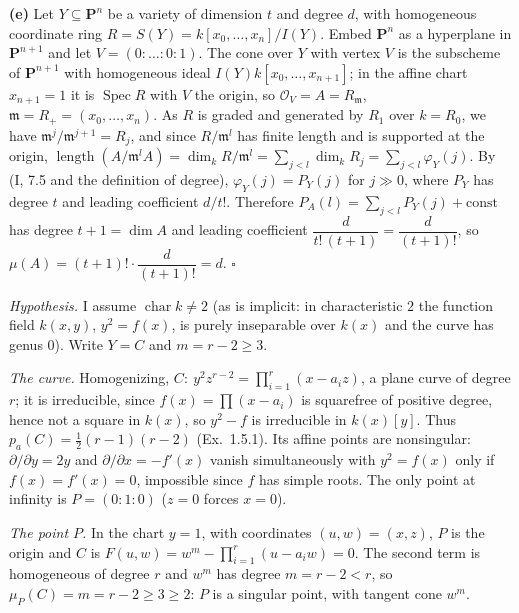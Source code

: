 \documentclass[11pt]{article}
\begin{document}
\textbf{(e)} Let $Y\subseteq\mathbf P^n$ be a variety of dimension $t$ and degree $d$, with homogeneous coordinate ring $R=S(Y)=k[x_0,\dots,x_n]/I(Y)$. Embed $\mathbf P^n$ as a hyperplane in $\mathbf P^{n+1}$ and let $V=(0:\dots:0:1)$. The cone over $Y$ with vertex $V$ is the subscheme of $\mathbf P^{n+1}$ with homogeneous ideal $I(Y)k[x_0,\dots,x_{n+1}]$; in the affine chart $x_{n+1}=1$ it is $\operatorname{Spec}R$ with $V$ the origin, so $\mathcal O_{V}=A=R_{\mathfrak m}$, $\mathfrak m=R_+=(x_0,\dots,x_n)$. As $R$ is graded and generated by $R_1$ over $k=R_0$, we have $\mathfrak m^j/\mathfrak m^{j+1}=R_j$, and since $R/\mathfrak m^l$ has finite length and is supported at the origin, $\operatorname{length}(A/\mathfrak m^lA)=\dim_kR/\mathfrak m^l=\sum_{j<l}\dim_kR_j=\sum_{j<l}\varphi_Y(j)$. By (I, 7.5 and the definition of degree), $\varphi_Y(j)=P_Y(j)$ for $j\gg0$, where $P_Y$ has degree $t$ and leading coefficient $d/t!$. Therefore $P_A(l)=\sum_{j<l}P_Y(j)+\mathrm{const}$ has degree $t+1=\dim A$ and leading coefficient $\dfrac{d}{t!\,(t+1)}=\dfrac d{(t+1)!}$, so $\mu(A)=(t+1)!\cdot\dfrac d{(t+1)!}=d$. \hfill$\square$

\pf
\emph{Hypothesis.} I assume $\operatorname{char}k\neq2$ (as is implicit: in characteristic $2$ the function field $k(x,y)$, $y^2=f(x)$, is purely inseparable over $k(x)$ and the curve has genus $0$). Write $Y=C$ and $m=r-2\ge3$.

\emph{The curve.} Homogenizing, $C:\ y^2z^{r-2}=\prod_{i=1}^r(x-a_iz)$, a plane curve of degree $r$; it is irreducible, since $f(x)=\prod(x-a_i)$ is squarefree of positive degree, hence not a square in $k(x)$, so $y^2-f$ is irreducible in $k(x)[y]$. Thus $p_a(C)=\frac12(r-1)(r-2)$ (Ex.~1.5.1). Its affine points are nonsingular: $\partial/\partial y=2y$ and $\partial/\partial x=-f'(x)$ vanish simultaneously with $y^2=f(x)$ only if $f(x)=f'(x)=0$, impossible since $f$ has simple roots. The only point at infinity is $P=(0:1:0)$ ($z=0$ forces $x=0$).

\emph{The point $P$.} In the chart $y=1$, with coordinates $(u,w)=(x,z)$, $P$ is the origin and $C$ is $F(u,w)=w^{m}-\prod_{i=1}^r(u-a_iw)=0$. The second term is homogeneous of degree $r$ and $w^m$ has degree $m=r-2<r$, so $\mu_P(C)=m=r-2\ge3\ge2$: $P$ is a singular point, with tangent cone $w^m$.
\end{document}
